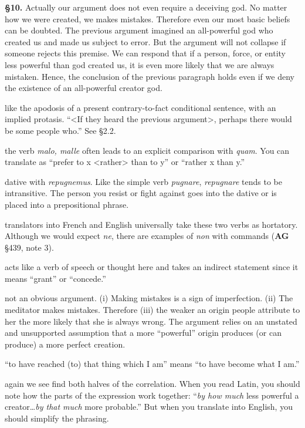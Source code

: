\prenotes

\textbf{§10.} Actually our argument does not even require a deceiving god. No matter how we were created, we makes mistakes. Therefore even our most basic beliefs can be doubted. The previous argument imagined an all-powerful god who created us and made us subject to error. But the argument will not collapse if someone rejects this premise. We can respond that if a person, force, or entity less powerful than god created us, it is even more likely that we are always mistaken. Hence, the conclusion of the previous paragraph holds even if we deny the existence of an all-powerful creator god.

 like the apodosis of a present contrary-to-fact conditional sentence, with an implied protasis. ``<If they heard the previous argument>, perhaps there would be some people who.'' See §2.2.

 the verb \textit{malo, malle} often leads to an explicit comparison with \textit{quam}. You can translate as ``prefer to x <rather> than to y'' or ``rather x than y.''

 dative with \textit{repugnemus}. Like the simple verb \textit{pugnare}, \textit{repugnare} tends to be intransitive. The person you resist or fight against goes into the dative or is placed into a prepositional phrase.

 translators into French and English universally take these two verbs as hortatory. Although we would expect \textit{ne}, there are examples of \textit{non} with commands (\textbf{AG} §439, note 3).

 acts like a verb of speech or thought here and takes an indirect statement since it means ``grant'' or ``concede.''

 not an obvious argument. (i) Making mistakes is a sign of imperfection. (ii) The meditator makes mistakes. Therefore (iii) the weaker an origin people attribute to her the more likely that she is always wrong. The argument relies on an unstated and unsupported assumption that a more ``powerful'' origin produces (or can produce) a more perfect creation.

 ``to have reached (to) that thing which I am'' means ``to have become what I am.''

 again we see find both halves of the correlation.  When you read Latin, you should note how the parts of the expression work together: ``\textit{by how much} less powerful a creator\dots \textit{by that much} more probable.'' But when you translate into English, you should simplify the phrasing.

